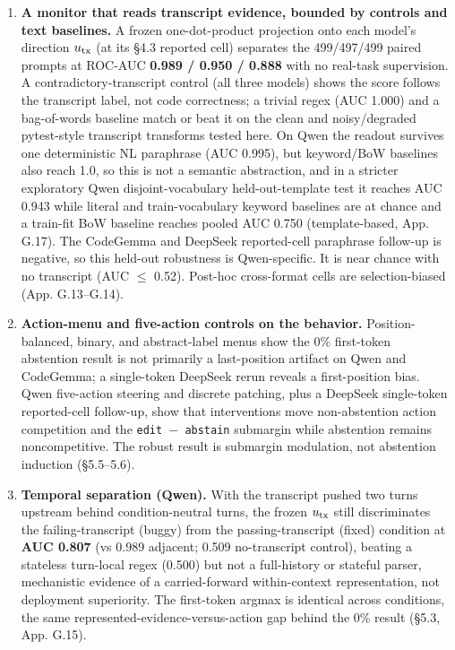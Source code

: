 \documentclass[
  11pt,
  a4paper]{article}
\begin{document}
\begin{enumerate}
  sampled grid and the max-statistic permutation null are Qwen-only;
  CodeGemma has an exploratory one-way F\ensuremath{\rightarrow}B layer\ensuremath{\times}position heatmap (App.
  D) plus reported-cell paired values; DeepSeek is reported-cell paired
  only. The no-transcript \texttt{code} variant has no Qwen peak, so the
  causal claim is specific to code-plus-transcript prompts (\S{}4; App. D).
\item
  \textbf{A monitor that reads transcript evidence, bounded by controls
  and text baselines.} A frozen one-dot-product projection onto each
  model's direction \(u_{\rm tx}\) (at its \S{}4.3 reported cell) separates
  the 499/497/499 paired prompts at ROC-AUC \textbf{0.989 / 0.950 /
  0.888} with no real-task supervision. A contradictory-transcript
  control (all three models) shows the score follows the transcript
  label, not code correctness; a trivial regex (AUC 1.000) and a
  bag-of-words baseline match or beat it on the clean and noisy/degraded
  pytest-style transcript transforms tested here. On Qwen the readout
  survives one deterministic NL paraphrase (AUC 0.995), but keyword/BoW
  baselines also reach 1.0, so this is not a semantic abstraction, and
  in a stricter exploratory Qwen disjoint-vocabulary held-out-template
  test it reaches AUC 0.943 while literal and train-vocabulary keyword
  baselines are at chance and a train-fit BoW baseline reaches pooled
  AUC 0.750 (template-based, App. G.17). The CodeGemma and DeepSeek
  reported-cell paraphrase follow-up is negative, so this held-out
  robustness is Qwen-specific. It is near chance with no transcript (AUC
  \ensuremath{\leq} 0.52). Post-hoc cross-format cells are selection-biased (App.
  G.13--G.14).
\item
  \textbf{Action-menu and five-action controls on the behavior.}
  Position-balanced, binary, and abstract-label menus show the 0\%
  first-token abstention result is not primarily a last-position
  artifact on Qwen and CodeGemma; a single-token DeepSeek rerun reveals
  a first-position bias. Qwen five-action steering and discrete
  patching, plus a DeepSeek single-token reported-cell follow-up, show
  that interventions move non-abstention action competition and the
  \texttt{edit\ \ensuremath{-}\ abstain} submargin while abstention remains
  noncompetitive. The robust result is submargin modulation, not
  abstention induction (\S{}5.5--5.6).
\item
  \textbf{Temporal separation (Qwen).} With the transcript pushed two
  turns upstream behind condition-neutral turns, the frozen
  \(u_{\rm tx}\) still discriminates the failing-transcript (buggy) from
  the passing-transcript (fixed) condition at \textbf{AUC 0.807} (vs
  0.989 adjacent; 0.509 no-transcript control), beating a stateless
  turn-local regex (0.500) but not a full-history or stateful parser,
  mechanistic evidence of a carried-forward within-context
  representation, not deployment superiority. The first-token argmax is
  identical across conditions, the same
  represented-evidence-versus-action gap behind the 0\% result (\S{}5.3,
  App. G.15).
\end{enumerate}
\end{document}
